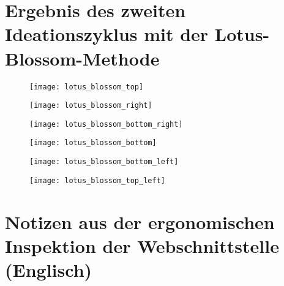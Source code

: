 
\section{Ergebnis des zweiten Ideationszyklus mit der Lotus-Blossom-Methode} \label{appendix:lotus_blossom}

\begin{figure}[H]
  \centering
  \texttt{[image: lotus\_blossom\_top]}
  \caption{}
  \label{fig:lotus_blossom_top}
\end{figure}
\begin{figure}[H]
  \centering
  \texttt{[image: lotus\_blossom\_right]}
  \caption{}
  \label{fig:lotus_blossom_right}
\end{figure}
\begin{figure}[H]
  \centering
  \texttt{[image: lotus\_blossom\_bottom\_right]}
  \caption{}
  \label{fig:lotus_blossom_bottom_right}
\end{figure}
\begin{figure}[H]
  \centering
  \texttt{[image: lotus\_blossom\_bottom]}
  \caption{}
  \label{fig:lotus_blossom_bottom}
\end{figure}
\begin{figure}[H]
  \centering
  \texttt{[image: lotus\_blossom\_bottom\_left]}
  \caption{}
  \label{fig:lotus_blossom_bottom_left}
\end{figure}
\begin{figure}[H]
  \centering
  \texttt{[image: lotus\_blossom\_top\_left]}
  \caption{}
  \label{fig:lotus_blossom_top_left}
\end{figure}


\section{Notizen aus der ergonomischen Inspektion der Webschnittstelle (Englisch)}

